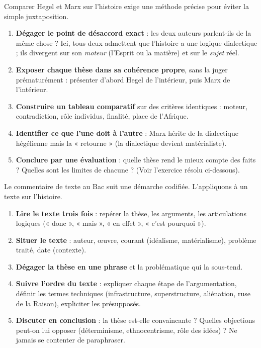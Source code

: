 \documentclass[11pt]{article}
\newcommand{\cle}[1]{{\popxbold\color{popdark}#1}}
\begin{document}
\begin{methode}
Comparer Hegel et Marx sur l'histoire exige une méthode précise pour éviter la simple juxtaposition.
\begin{enumerate}
\item \textbf{Dégager le point de désaccord exact} : les deux auteurs parlent-ils de la même chose ? Ici, tous deux admettent que l'histoire a une logique dialectique ; ils divergent sur son \emph{moteur} (l'Esprit ou la matière) et sur le \emph{sujet} réel.
\item \textbf{Exposer chaque thèse dans sa cohérence propre}, sans la juger prématurément : présenter d'abord Hegel de l'intérieur, puis Marx de l'intérieur.
\item \textbf{Construire un tableau comparatif} sur des critères identiques : moteur, contradiction, rôle individus, finalité, place de l'Afrique.
\item \textbf{Identifier ce que l'une doit à l'autre} : Marx hérite de la dialectique hégélienne mais la « retourne » (la dialectique devient matérialiste).
\item \textbf{Conclure par une évaluation} : quelle thèse rend le mieux compte des faits ? Quelles sont les limites de chacune ? (Voir l'exercice résolu ci-dessous).
\end{enumerate}
\end{methode}

\begin{methode}
Le commentaire de texte au Bac suit une démarche codifiée. L'appliquons à un texte sur l'histoire.
\begin{enumerate}
\item \textbf{Lire le texte trois fois} : repérer la thèse, les arguments, les articulations logiques (« donc », « mais », « en effet », « c'est pourquoi »).
\item \textbf{Situer le texte} : auteur, œuvre, courant (idéalisme, matérialisme), problème traité, date (contexte).
\item \textbf{Dégager la thèse en une phrase} et la problématique qui la sous-tend.
\item \textbf{Suivre l'ordre du texte} : expliquer chaque étape de l'argumentation, définir les termes techniques (\cle{infrastructure}, \cle{superstructure}, \cle{aliénation}, \cle{ruse de la Raison}), expliciter les présupposés.
\item \textbf{Discuter en conclusion} : la thèse est-elle convaincante ? Quelles objections peut-on lui opposer (déterminisme, ethnocentrisme, rôle des idées) ? Ne jamais se contenter de paraphraser.
\end{enumerate}
\end{methode}
\end{document}
